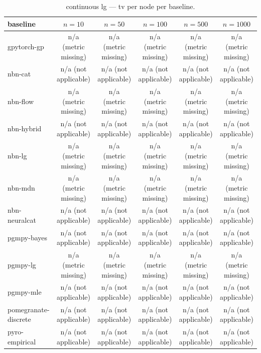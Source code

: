 \begin{table}[h]
\centering
\caption{continuous lg — tv per node per baseline.}
\label{tab:continuous_lg_tv_per_node}
\begin{tabular}{lccccc}
\toprule
baseline & $n=10$ & $n=50$ & $n=100$ & $n=500$ & $n=1000$ \\
\midrule
gpytorch-gp & n/a (metric missing) & n/a (metric missing) & n/a (metric missing) & n/a (metric missing) & n/a (metric missing) \\
nbn-cat & n/a (not applicable) & n/a (not applicable) & n/a (not applicable) & n/a (not applicable) & n/a (not applicable) \\
nbn-flow & n/a (metric missing) & n/a (metric missing) & n/a (metric missing) & n/a (metric missing) & n/a (metric missing) \\
nbn-hybrid & n/a (not applicable) & n/a (not applicable) & n/a (not applicable) & n/a (not applicable) & n/a (not applicable) \\
nbn-lg & n/a (metric missing) & n/a (metric missing) & n/a (metric missing) & n/a (metric missing) & n/a (metric missing) \\
nbn-mdn & n/a (metric missing) & n/a (metric missing) & n/a (metric missing) & n/a (metric missing) & n/a (metric missing) \\
nbn-neuralcat & n/a (not applicable) & n/a (not applicable) & n/a (not applicable) & n/a (not applicable) & n/a (not applicable) \\
pgmpy-bayes & n/a (not applicable) & n/a (not applicable) & n/a (not applicable) & n/a (not applicable) & n/a (not applicable) \\
pgmpy-lg & n/a (metric missing) & n/a (metric missing) & n/a (metric missing) & n/a (metric missing) & n/a (metric missing) \\
pgmpy-mle & n/a (not applicable) & n/a (not applicable) & n/a (not applicable) & n/a (not applicable) & n/a (not applicable) \\
pomegranate-discrete & n/a (not applicable) & n/a (not applicable) & n/a (not applicable) & n/a (not applicable) & n/a (not applicable) \\
pyro-empirical & n/a (not applicable) & n/a (not applicable) & n/a (not applicable) & n/a (not applicable) & n/a (not applicable) \\
\bottomrule
\end{tabular}
\end{table}

